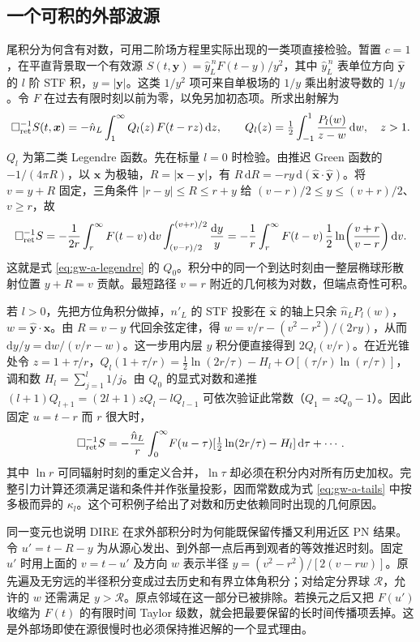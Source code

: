 \subsection{一个可积的外部波源}

尾积分为何含有对数，可用二阶场方程里实际出现的一类项直接检验。暂置 $c=1$，在平直背景取一个有效源 $S(t,\bm y)=\hat y_{L}^{\,n}F(t-y)/y^2$，其中 $\hat y_L^{\,n}$ 表单位方向 $\hat{\bm y}$ 的 $l$ 阶 STF 积，$y=|\bm y|$。这类 $1/y^2$ 项可来自单极场的 $1/y$ 乘出射波导数的 $1/y$。令 $F$ 在过去有限时刻以前为零，以免另加初态项。所求出射解为
\begin{equation}
 \square^{-1}_{\rm ret}S(t,\bm x)
 =-\hat n_L\int_1^\infty Q_l(z)\,F(t-rz)\,\mathrm dz,\qquad
 Q_l(z)=\tfrac12\int_{-1}^1\frac{P_l(w)}{z-w}\,\mathrm dw,\quad z>1 .
 \label{eq:gw-a-legendre}
\end{equation}
$Q_l$ 为第二类 Legendre 函数。先在标量 $l=0$ 时检验。由推迟 Green 函数的 $-1/(4\pi R)$，以 $\bm x$ 为极轴，$R=|\bm x-\bm y|$，有 $R\,\mathrm dR=-ry\,\mathrm d(\hat{\bm x}\cdot\hat{\bm y})$。将 $v=y+R$ 固定，三角条件 $|r-y|\le R\le r+y$ 给 $(v-r)/2\le y\le(v+r)/2$、$v\ge r$，故
\[
 \square^{-1}_{\rm ret}S
 =-\frac1{2r}\int_r^\infty F(t-v)\,\mathrm dv
       \int_{(v-r)/2}^{(v+r)/2}\frac{\mathrm dy}{y}
 =-\frac1r\int_r^\infty F(t-v)\,
              \frac12\ln\!\left(\frac{v+r}{v-r}\right)\mathrm dv .
\]
这就是式 \eqref{eq:gw-a-legendre} 的 $Q_0$。积分中的同一个到达时刻由一整层椭球形散射位置 $y+R=v$ 贡献。最短路径 $v=r$ 附近的几何核为对数，但端点奇性可积。

若 $l>0$，先把方位角积分做掉，$n'_L$ 的 STF 投影在 $\hat{\bm x}$ 的轴上只余 $\hat n_L P_l(w)$，$w=\hat{\bm y}\cdot\hat{\bm x}$。由 $R=v-y$ 代回余弦定律，得 $w=v/r-(v^2-r^2)/(2ry)$，从而 $\mathrm dy/y=\mathrm dw/(v/r-w)$。这一步用内层 $y$ 积分便直接得到 $2Q_l(v/r)$。在近光锥处令 $z=1+\tau/r$，$Q_l(1+\tau/r)=\tfrac12\ln(2r/\tau)-H_l+O[(\tau/r)\ln(r/\tau)]$，调和数 $H_l=\sum_{j=1}^l1/j$。由 $Q_0$ 的显式对数和递推 $(l+1)Q_{l+1}=(2l+1)zQ_l-lQ_{l-1}$ 可依次验证此常数（$Q_1=zQ_0-1$）。因此固定 $u=t-r$ 而 $r$ 很大时，
\[
 \square^{-1}_{\rm ret}S
  =-\frac{\hat n_L}{r}\int_0^\infty\! F(u-\tau)
            [\tfrac12\ln(2r/\tau)-H_l]\,\mathrm d\tau+\cdots .
\]
其中 $\ln r$ 可同辐射时刻的重定义合并，$\ln\tau$ 却必须在积分内对所有历史加权。完整引力计算还须满足谐和条件并作张量投影，因而常数成为式 \eqref{eq:gw-a-tails} 中按多极而异的 $\kappa_l$。这个可积例子给出了对数和历史依赖同时出现的几何原因。

同一变元也说明 DIRE 在求外部积分时为何能既保留传播又利用近区 PN 结果。令 $u'=t-R-y$ 为从源心发出、到外部一点后再到观者的等效推迟时刻。固定 $u'$ 时用上面的 $v=t-u'$ 及方向 $w$ 表示半径 $y=(v^2-r^2)/[2(v-rw)]$。原先遍及无穷远的半径积分变成过去历史和有界立体角积分；对给定分界球 $\mathcal R$，允许的 $w$ 还需满足 $y>\mathcal R$。原点邻域在这一部分已被排除。若换元之后又把 $F(u')$ 收缩为 $F(t)$ 的有限时间 Taylor 级数，就会把最要保留的长时间传播项丢掉。这是外部场即使在源很慢时也必须保持推迟解的一个显式理由。

